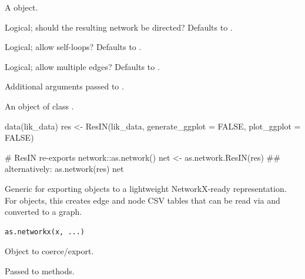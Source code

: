 \documentclass[a4paper]{book}
\begin{document}
%
\begin{Arguments}
\begin{ldescription}
\item[\code{x}] A  object.

\item[\code{directed}] Logical; should the resulting network be directed?
Defaults to .

\item[\code{loops}] Logical; allow self-loops? Defaults to .

\item[\code{multiple}] Logical; allow multiple edges? Defaults to .

\item[\code{...}] Additional arguments passed to .
\end{ldescription}
\end{Arguments}
%
\begin{Value}
An object of class .
\end{Value}
%
\begin{Examples}
\begin{ExampleCode}
data(lik_data)
res <- ResIN(lik_data, generate_ggplot = FALSE, plot_ggplot = FALSE)

# ResIN re-exports network::as.network()
net <- as.network.ResIN(res) ## alternatively: as.network(res)
net

\end{ExampleCode}
\end{Examples}
%
\begin{Description}
Generic for exporting objects to a lightweight NetworkX-ready representation.
For  objects, this creates edge and node CSV tables that can be
read via  and converted to a  graph.
\end{Description}
%
\begin{Usage}
\begin{verbatim}
as.networkx(x, ...)
\end{verbatim}
\end{Usage}
%
\begin{Arguments}
\begin{ldescription}
\item[\code{x}] Object to coerce/export.

\item[\code{...}] Passed to methods.
\end{ldescription}
\end{Arguments}
\end{document}
